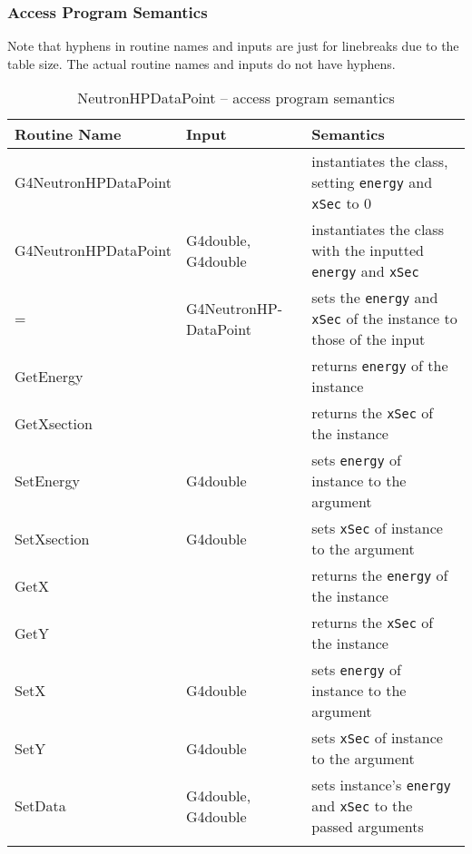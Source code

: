 \documentclass[12pt]{article}
\begin{document}
\subsubsection{Access Program Semantics}%
Note that hyphens in routine names and inputs are just for linebreaks due to the table size. The actual routine names and inputs do not have hyphens.

\begin{table}[H]
\caption{NeutronHPDataPoint -- access program semantics}\label{Table_NeutronHPDataPointSemantics}
\begin{tabular}{l p{} p{}}
\toprule
\bf Routine Name & \bf Input & \bf Semantics \\\midrule
\arrayrulecolor{lightgray}
G4NeutronHPDataPoint  &                      & instantiates the class, setting \texttt{energy} and \texttt{xSec} to 0\\\hline
G4NeutronHPDataPoint  & G4double, G4double   & instantiates the class with the inputted \texttt{energy} and \texttt{xSec}\\\hline
=                     & G4NeutronHP-DataPoint& sets the \texttt{energy} and \texttt{xSec} of the instance to those of the input \\\hline
GetEnergy             &                      & returns \texttt{energy} of the instance \\\hline
GetXsection           &                      & returns the \texttt{xSec} of the instance\\\hline
SetEnergy             & G4double             & sets \texttt{energy} of instance to the argument\\\hline
SetXsection           & G4double             & sets \texttt{xSec} of instance to the argument\\\hline
GetX                  &                      & returns the \texttt{energy} of the instance\\\hline
GetY 				  &                      & returns the \texttt{xSec} of the instance\\\hline
SetX				  & G4double             & sets \texttt{energy} of instance to the argument\\\hline
SetY				  & G4double             & sets \texttt{xSec} of instance to the argument \\\hline
SetData				  & G4double, G4double   & sets instance's \texttt{energy} and \texttt{xSec} to the passed arguments\\
\arrayrulecolor{black}
\bottomrule
\end{tabular}
\end{table}
\end{document}
